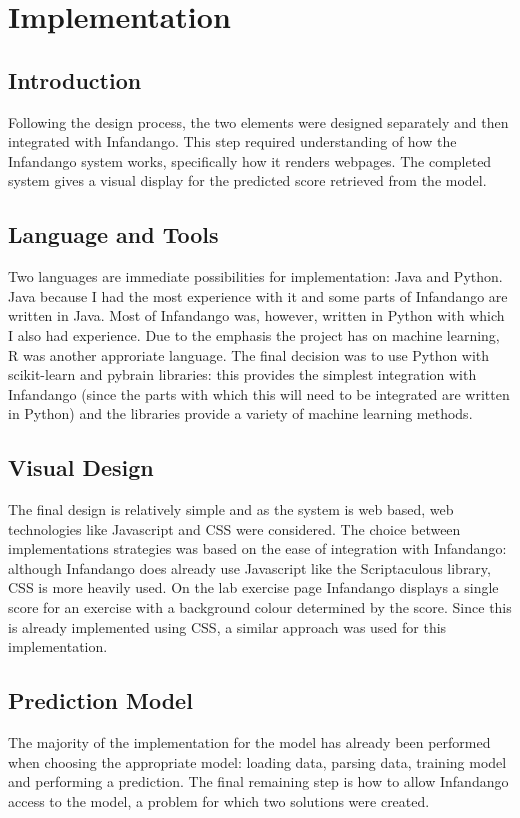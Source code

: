 \chapter{Implementation}
\label{implementation}
\section{Introduction}
Following the design process, the two elements were designed separately and then integrated with Infandango. This step required understanding of how the Infandango system works, specifically how it renders webpages. The completed system gives a visual display for the predicted score retrieved from the model.

\section{Language and Tools}
Two languages are immediate possibilities for implementation: Java\cite{java_site} and Python\cite{python_site}. Java because I had the most experience with it and some parts of Infandango are written in Java. Most of Infandango was, however, written in Python with which I also had experience. Due to the emphasis the project has on machine learning, R\cite{r_site} was another approriate language. 
The final decision was to use Python with scikit-learn\cite{scikit_site} and pybrain\cite{pybrain_site} libraries: this provides the simplest integration with Infandango (since the parts with which this will need to be integrated are written in Python) and the libraries provide a variety of machine learning methods.

\section{Visual Design}
The final design is relatively simple and as the system is web based, web technologies like Javascript and CSS were considered. The choice between implementations strategies was based on the ease of integration with Infandango: although Infandango does already use Javascript like the Scriptaculous library\cite{scriptaculous_cite}, CSS is more heavily used. On the lab exercise page Infandango displays a single score for an exercise with a background colour determined by the score. Since this is already implemented using CSS, a similar approach was used for this implementation.

\section{Prediction Model}
The majority of the implementation for the model has already been performed when choosing the appropriate model: loading data, parsing data, training model and performing a prediction. The final remaining step is how to allow Infandango access to the model, a problem for which two solutions were created. 

